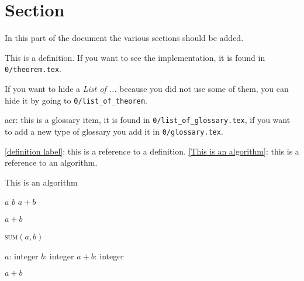 \documentclass{article}
\begin{document}
    


    \makeCustomTitle
    
    
    \tableofcontents
    
    
    \section{Section}
        In this part of the document the various sections should be added.

        \begin{definition}[Definition] \label{definition label}

            This is a definition. If you want to see the implementation, it is found in \texttt{0/theorem.tex}.
        \end{definition}

        If you want to hide a \textit{List of ...} because you did not use some of them, you can hide it by going to \texttt{0/list\_of\_theorem}.

        \gls{acr}: this is a glossary item, it is found in \texttt{0/list\_of\_glossary.tex}, if you want to add a new type of glossary you add it in \texttt{0/glossary.tex}.

        \cref{definition label}: this is a reference to a definition. \cref{This is an algorithm}: this is a reference to an algorithm.

        \begin{algorithm}[H]
            \scriptsize
            \caption{This is an algorithm} \label{This is an algorithm}
            \begin{algorithmic}[1]
                \Require
                    \Statex $a$ 
                    \Statex $b$ 
                \Ensure
                    \Statex $a + b$ 
                \Statex
                
                    \State \Return $a + b$
                \EndProcedure
            \end{algorithmic}
        \end{algorithm}

        \begin{algorithm}[H]
            \scriptsize
            \caption{\textsc{sum}{$\left(a, b\right)$}} \label{This }
            \begin{algorithmic}[1]
                \Require
                    \Statex $a$: integer 
                    \Statex $b$: integer 
                \Ensure
                    \Statex $a + b$: integer 
                \Statex
                
                \State \Return $a + b$
            \end{algorithmic}
        \end{algorithm}
\end{document}
